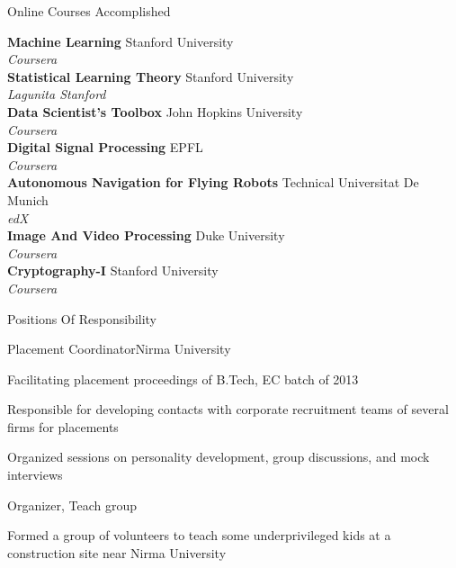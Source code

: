 \documentclass{resume} %
\begin{document}
	\begin{rSection}{Online Courses Accomplished}
		
		\textbf{Machine Learning} \hfill {Stanford University}\\
		\textit{Coursera}
		\vspace{0.1 in}
		\\
		\textbf{Statistical Learning Theory} \hfill{Stanford University}\\
		\textit{Lagunita Stanford}
		\vspace{0.1 in}
		\\
		\textbf{Data Scientist's Toolbox} \hfill {John Hopkins University}\\
		\textit{Coursera}
		\vspace{0.1 in}
		\\
		\textbf{Digital Signal Processing} \hfill{EPFL}\\
		\textit{Coursera}
		\vspace{0.1 in}
		\\
		\textbf{Autonomous Navigation for Flying Robots} \hfill{Technical Universitat De Munich}\\
		\textit{edX}
		\vspace{0.1 in}
		\\
		\textbf{Image And Video Processing} \hfill {Duke University}\\
		\textit{Coursera}
		\vspace{0.1 in}
		\\
	\textbf{Cryptography-I} \hfill {Stanford University}\\
	\textit{Coursera}
	\vspace{0.1 in}	
		\end{rSection}
		
		\begin{rSection}{Positions Of Responsibility}	%
		
		\begin{rSubsection}{Placement Coordinator}{Nirma University}{}{}
			\item Facilitating placement proceedings of B.Tech, EC batch of 2013
			\item Responsible for developing contacts with corporate recruitment teams of several firms for placements 
			\item Organized sessions on personality development, group discussions, and mock interviews
		\end{rSubsection}
		
		
		\begin{rSubsection}{Organizer, Teach group}{}{}{}
		\item Formed  a group of volunteers to teach some underprivileged kids at a construction site near Nirma University 
		\end{rSubsection}
		
	\end{rSection}
	
\end{document}
